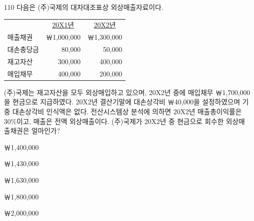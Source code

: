 \begin{question}{110}
다음은 (주)국제의 대차대조표상 외상매출자료이다.

{\small\centering
\begin{tabular}{lrr}
\hline
 & \multicolumn{1}{c}{\uline{20X1년}} & \multicolumn{1}{c}{\uline{20X2년}} \\
매출채권 & ￦1,000,000 & ￦1,300,000 \\
대손충당금 & 80,000 & 50,000 \\
재고자산 & 300,000 & 400,000 \\
매입채무 & 400,000 & 200,000 \\
\hline
\end{tabular}
\par}

(주)국제는 재고자산을 모두 외상매입하고 있으며, 20X2년 중에 매입채무 ￦1,700,000을 현금으로 지급하였다. 20X2년 결산기말에 대손상각비 ￦40,000을 설정하였으며 기중 대손상각비 인식액은 없다. 전산시스템상 분석에 의하면 20X2년 매출총이익률은 30\%이고, 매출은 전액 외상매출이다. (주)국제가 20X2년 중 현금으로 회수한 외상매출채권은 얼마인가? \par
\begin{choices}
  \item ￦1,400,000
  \item ￦1,430,000
  \item ￦1,630,000
  \item ￦1,800,000
  \item ￦2,000,000
\end{choices}
\end{question}
